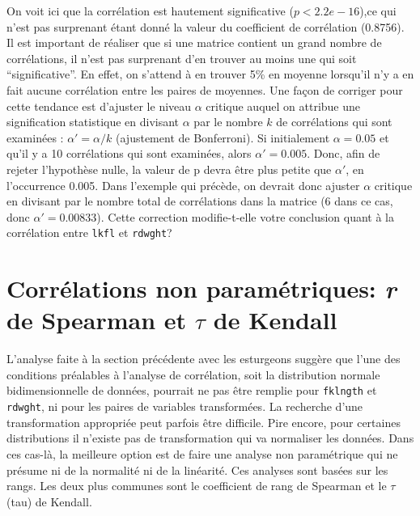 \documentclass[12pt,]{book}
\begin{document}
On voit ici que la corrélation est hautement significative (\(p < 2.2e-16\)),ce qui n'est pas surprenant étant donné la valeur du coefficient de corrélation (0.8756).
Il est important de réaliser que si une matrice contient un grand nombre de corrélations, il n'est pas surprenant d'en trouver au moins une qui soit ``significative''.
En effet, on s'attend à en trouver 5\% en moyenne lorsqu'il n'y a en fait aucune corrélation entre les paires de moyennes.
Une façon de corriger pour cette tendance est d'ajuster le niveau \(\alpha\) critique auquel on attribue une signification statistique en divisant \(\alpha\) par le nombre \(k\) de corrélations qui sont examinées : \(\alpha' = \alpha / k\) (ajustement de Bonferroni). Si initialement \(\alpha = 0.05\) et qu'il y a 10 corrélations qui sont examinées, alors \(\alpha'= 0.005\).
Donc, afin de rejeter l'hypothèse nulle, la valeur de p devra être plus petite que \(\alpha'\), en l'occurrence 0.005.
Dans l'exemple qui précède, on devrait donc ajuster \(\alpha\) critique en divisant par le nombre total de corrélations dans la matrice (6 dans ce cas, donc \(\alpha'=0.00833\)).
Cette correction modifie-t-elle votre conclusion quant à la corrélation entre \texttt{lkfl} et \texttt{rdwght}?

\hypertarget{corruxe9lations-non-paramuxe9triques-r-de-spearman-et-tau-de-kendall}{%
\section{\texorpdfstring{Corrélations non paramétriques: \emph{r} de Spearman et \(\tau\) de Kendall}{Corrélations non paramétriques: r de Spearman et \textbackslash{}tau de Kendall}}\label{corruxe9lations-non-paramuxe9triques-r-de-spearman-et-tau-de-kendall}}

L'analyse faite à la section précédente avec les esturgeons suggère que l'une des conditions préalables à l'analyse de corrélation, soit la distribution normale bidimensionnelle de données, pourrait ne pas être remplie pour \texttt{fklngth} et \texttt{rdwght}, ni pour les paires de variables transformées.
La recherche d'une transformation appropriée peut parfois être difficile.
Pire encore, pour certaines distributions il n'existe pas de transformation qui va normaliser les données.
Dans ces cas-là, la meilleure option est de faire une analyse non
paramétrique qui ne présume ni de la normalité ni de la linéarité.
Ces analyses sont basées sur les rangs.
Les deux plus communes sont le coefficient de rang de Spearman et le \(\tau\) (tau) de Kendall.
\end{document}
